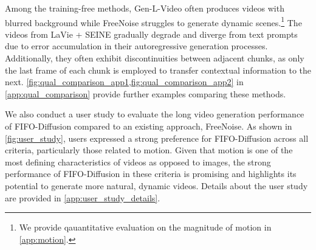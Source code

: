 Among the training-free methods, Gen-L-Video often produces videos with blurred background while FreeNoise struggles to generate dynamic scenes.\footnote{We provide qauantitative evaluation on the magnitude of motion in \cref{app:motion}.}
The videos from LaVie + SEINE gradually degrade and diverge from text prompts due to error accumulation in their autoregressive generation processes.
Additionally, they often exhibit discontinuities between adjacent chunks, as only the last frame of each chunk is employed to transfer contextual information to the next.
\cref{fig:qual_comparison_app1,fig:qual_comparison_app2} in \cref{app:qual_comparison} provide further examples comparing these methods.

We also conduct a user study to evaluate the long video generation performance of FIFO-Diffusion compared to an existing approach, FreeNoise. 
As shown in \cref{fig:user_study}, users expressed a strong preference for FIFO-Diffusion across all criteria, particularly those related to motion. 
Given that motion is one of the most defining characteristics of videos as opposed to images, the strong performance of FIFO-Diffusion in these criteria is promising and highlights its potential to generate more natural, dynamic videos. 
Details about the user study are provided in \cref{app:user_study_details}.



\begin{table}[t]
    \caption{Comparisons of $\text{FVD}_{128}$ and IS scores on UCF-101. FIFO-Diffusion with latent partitioning and lookahead denoising utilizes Latte~\cite{ma2024latte} as its baseline, where the number of partitions is four ($n=4$).
    The FVD and IS scores of the other algorithms are obtained from their respective papers, and PVDM~\citep{yu2023pvdm} denotes PVDM-L~(400-400s).\vspace{2mm}}
    \centering
    \renewcommand{\arraystretch}{1}
    \setlength{\tabcolsep}{8mm}
    \label{tab:fvd128}
\end{table}

